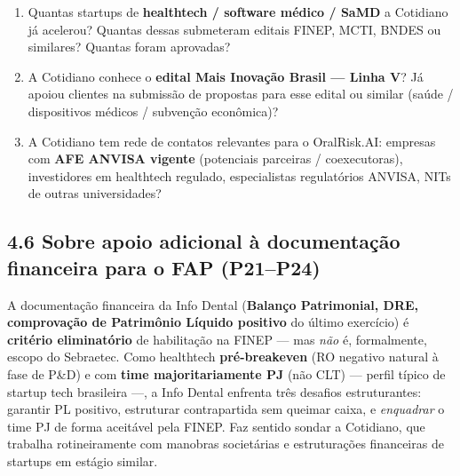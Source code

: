 \documentclass[11pt, a4paper]{article}
\begin{document}
\begin{enumerate}[label=\textcolor{primaryColor}{\textbf{P\arabic*.}}, leftmargin=2.2em, start=18]
    \item Quantas startups de \textbf{healthtech / software médico / SaMD} a Cotidiano já acelerou? Quantas dessas submeteram editais FINEP, MCTI, BNDES ou similares? Quantas foram aprovadas?
    \item A Cotidiano conhece o \textbf{edital Mais Inovação Brasil --- Linha V}? Já apoiou clientes na submissão de propostas para esse edital ou similar (saúde / dispositivos médicos / subvenção econômica)?
    \item A Cotidiano tem rede de contatos relevantes para o OralRisk.AI: empresas com \textbf{AFE ANVISA vigente} (potenciais parceiras / coexecutoras), investidores em healthtech regulado, especialistas regulatórios ANVISA, NITs de outras universidades?
\end{enumerate}

\subsection{4.6 Sobre apoio adicional à documentação financeira para o FAP (P21--P24)}

A documentação financeira da Info Dental (\textbf{Balanço Patrimonial, DRE, comprovação de Patrimônio Líquido positivo} do último exercício) é \textbf{critério eliminatório} de habilitação na FINEP --- mas \emph{não} é, formalmente, escopo do Sebraetec. Como healthtech \textbf{pré-breakeven} (RO negativo natural à fase de P\&D) e com \textbf{time majoritariamente PJ} (não CLT) --- perfil típico de startup tech brasileira ---, a Info Dental enfrenta três desafios estruturantes: garantir PL positivo, estruturar contrapartida sem queimar caixa, e \emph{enquadrar} o time PJ de forma aceitável pela FINEP. Faz sentido sondar a Cotidiano, que trabalha rotineiramente com manobras societárias e estruturações financeiras de startups em estágio similar.
\end{document}
